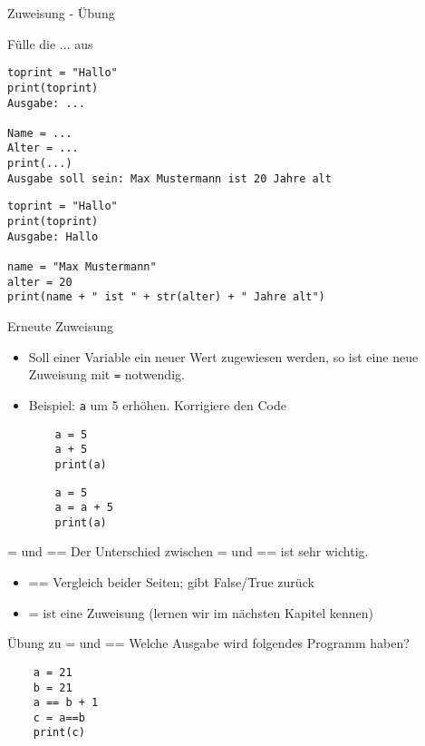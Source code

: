 \begin{frame}[fragile]{Zuweisung - Übung}

Fülle die ... aus
\begin{lstlisting}
toprint = "Hallo"
print(toprint)
Ausgabe: ...

Name = ...
Alter = ...
print(...)
Ausgabe soll sein: Max Mustermann ist 20 Jahre alt
\end{lstlisting}

\pause{}

\begin{lstlisting}
toprint = "Hallo"
print(toprint)
Ausgabe: Hallo

name = "Max Mustermann"
alter = 20
print(name + " ist " + str(alter) + " Jahre alt")
\end{lstlisting}

\end{frame}



\begin{frame}[fragile]{Erneute Zuweisung}
\begin{itemize}
	\item Soll einer Variable ein neuer Wert zugewiesen werden, so ist eine neue Zuweisung mit  \texttt{=} notwendig.
	\item Beispiel: \texttt{a} um 5 erhöhen. Korrigiere den Code
	\begin{lstlisting}
	a = 5
	a + 5
	print(a)
	\end{lstlisting}
	\pause{}
	\begin{lstlisting}
	a = 5
	a = a + 5
	print(a)
	\end{lstlisting}
	
\end{itemize}
\end{frame}






\begin{frame}[fragile]{= und == }
Der Unterschied zwischen = und == ist sehr wichtig.
\begin{itemize}
\item == Vergleich beider Seiten; gibt False/True zurück
\item = ist eine Zuweisung (lernen wir im nächsten Kapitel kennen)
\end{itemize}
\end{frame}

\begin{frame}[fragile]{Übung zu = und == }
Welche Ausgabe wird folgendes Programm haben?
	\begin{lstlisting}
	a = 21
	b = 21
	a == b + 1
	c = a==b
	print(c)
	\end{lstlisting}
\end{frame}


